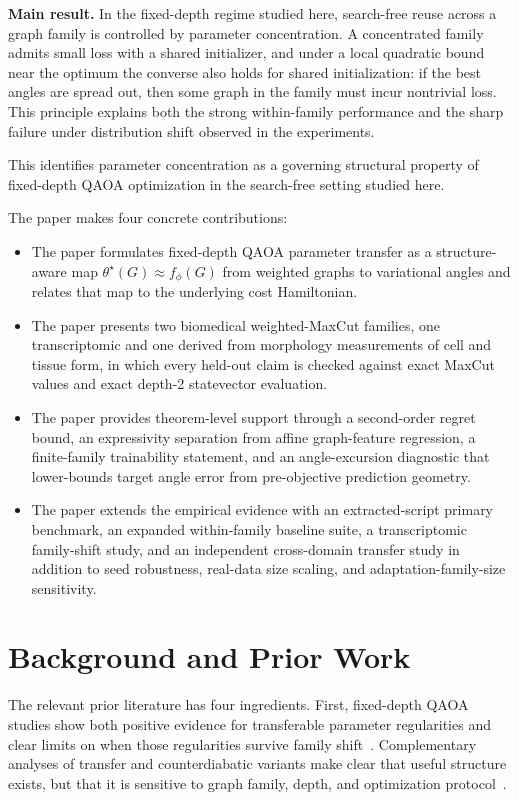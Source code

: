 \documentclass[
  reprint,
  twocolumn,
  aps,
  superscriptaddress,
  longbibliography,
  floatfix
]{revtex4-2}
\begin{document}
\textbf{Main result.} In the fixed-depth regime studied here, search-free reuse across a graph family is controlled by parameter concentration. A concentrated family admits small loss with a shared initializer, and under a local quadratic bound near the optimum the converse also holds for shared initialization: if the best angles are spread out, then some graph in the family must incur nontrivial loss. This principle explains both the strong within-family performance and the sharp failure under distribution shift observed in the experiments.

This identifies parameter concentration as a governing structural property of fixed-depth QAOA optimization in the search-free setting studied here.

The paper makes four concrete contributions:
\begin{itemize}
  \item The paper formulates fixed-depth QAOA parameter transfer as a structure-aware map $\theta^\star(G) \approx f_\phi(G)$ from weighted graphs to variational angles and relates that map to the underlying cost Hamiltonian.
  \item The paper presents two biomedical weighted-MaxCut families, one transcriptomic and one derived from morphology measurements of cell and tissue form, in which every held-out claim is checked against exact MaxCut values and exact depth-2 statevector evaluation.
  \item The paper provides theorem-level support through a second-order regret bound, an expressivity separation from affine graph-feature regression, a finite-family trainability statement, and an angle-excursion diagnostic that lower-bounds target angle error from pre-objective prediction geometry.
  \item The paper extends the empirical evidence with an extracted-script primary benchmark, an expanded within-family baseline suite, a transcriptomic family-shift study, and an independent cross-domain transfer study in addition to seed robustness, real-data size scaling, and adaptation-family-size sensitivity.
\end{itemize}

\section{Background and Prior Work}
The relevant prior literature has four ingredients. First, fixed-depth QAOA studies show both positive evidence for transferable parameter regularities and clear limits on when those regularities survive family shift~\cite{zhou2020,akshay2021}. Complementary analyses of transfer and counterdiabatic variants make clear that useful structure exists, but that it is sensitive to graph family, depth, and optimization protocol~\cite{galda2021,wurtz2021}.
\end{document}
